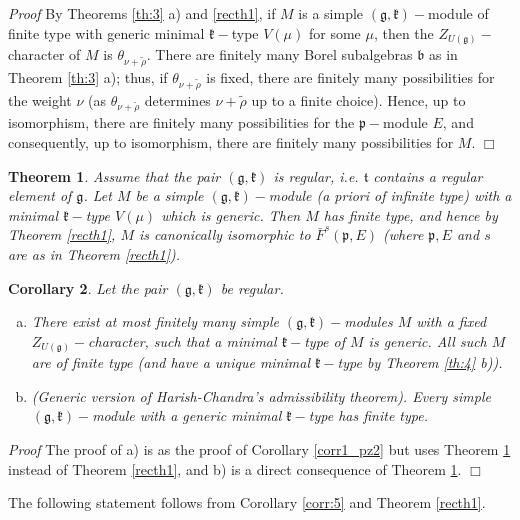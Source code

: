 \documentclass[default]{./styles/svmult}
\newtheorem{theo}{Theorem}[section]
\newtheorem{cor}[theo]{Corollary}
\renewenvironment{proof}{ \emph{Proof}}{$\Box$}
\newcommand{\bb}{\mathfrak{b}}
\renewcommand{\gg}{\mathfrak{g}}
\newcommand{\kk}{\mathfrak{k}}
\newcommand{\pp}{\mathfrak{p}}
\renewcommand{\tt}{\mathfrak{t}}
\begin{document}
\begin{proof}
 By Theorems \ref{th:3} a) and \ref{recth1}, if $M$ is a simple $(\gg,\kk)-$module of finite type with generic minimal $\kk-$type $V(\mu)$ for some $\mu$, then the $Z_{U(\gg)}-$character of $M$ is $\theta_{\nu + \tilde{\rho}}$. There are finitely many Borel subalgebras $\bb$ as in Theorem \ref{th:3} a); thus, if $\theta_{\nu + \tilde{\rho}}$ is fixed, there are finitely many possibilities for the weight $\nu$ (as $\theta_{\nu + \tilde{\rho}}$ determines $\nu + \tilde{\rho}$ up to a finite choice). Hence, up to isomorphism, there are finitely many possibilities for the $\pp-$module $E$, and consequently, up to isomorphism, there are finitely many possibilities for $M$.
\end{proof}

\begin{theo}\label{recth2}
 Assume that the pair $(\gg,\kk)$ is regular, i.e. $\tt$ contains a regular element of $\gg$. Let $M$ be a simple $(\gg,\kk)-$module (a priori of infinite type) with a minimal $\kk-$type $V(\mu)$ which is generic. Then $M$ has finite type, and hence by Theorem \ref{recth1}, $M$ is canonically isomorphic to $\bar{F}^s(\pp,E)$ (where $\pp,E$ and $s$ are as in Theorem \ref{recth1}).
\end{theo}

\begin{cor}\label{corr2_pz2}
 Let the pair $(\gg,\kk)$ be regular.
 \begin{enumerate}[a)]
  \item There exist at most finitely many simple $(\gg,\kk)-$modules $M$ with a fixed $Z_{U(\gg)}-$character, such that a minimal $\kk-$type of $M$ is generic. All such $M$ are of finite type (and have a unique minimal $\kk-$type by Theorem \ref{th:4} b)).
  \item (Generic version of Harish-Chandra's admissibility theorem). Every simple $(\gg,\kk)-$module with a generic minimal $\kk-$type has finite type.
 \end{enumerate}
\end{cor}

\begin{proof}
 The proof of a) is as the proof of Corollary \ref{corr1_pz2} but uses Theorem \ref{recth2} instead of Theorem \ref{recth1}, and b) is a direct consequence of Theorem \ref{recth2}.
\end{proof}

\vspace{0.3cm}

The following statement follows from Corollary \ref{corr:5} and Theorem \ref{recth1}.
\end{document}
